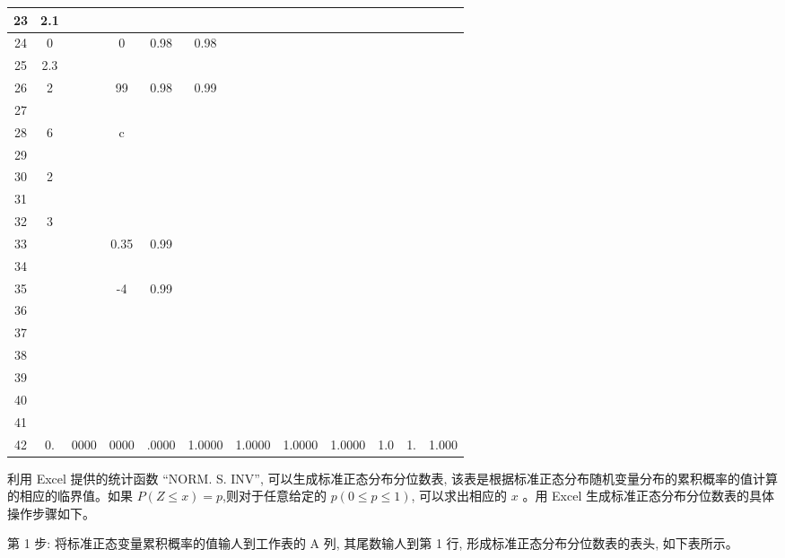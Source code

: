 \documentclass[10pt]{article}
\begin{document}
\begin{CJK*}{UTF8}{bsmi}
\begin{center}
\begin{tabular}{|c|c|c|c|c|c|c|c|c|c|c|c|}
\hline
23 & 2.1 &  &  &  &  &  &  &  &  &  &  \\
\hline
24 & 0 &  & 0 & 0.98 & 0.98 &  &  &  &  &  &  \\
\hline
25 & 2.3 &  &  &  &  &  &  &  &  &  &  \\
\hline
26 & 2 &  & 99 & 0.98 & 0.99 &  &  &  &  &  &  \\
\hline
27 &  &  &  &  &  &  &  &  &  &  &  \\
\hline
28 & 6 &  & c &  &  &  &  &  &  &  &  \\
\hline
29 &  &  &  &  &  &  &  &  &  &  &  \\
\hline
30 & 2 &  &  &  &  &  &  &  &  &  &  \\
\hline
31 &  &  &  &  &  &  &  &  &  &  &  \\
\hline
32 & 3 &  &  &  &  &  &  &  &  &  &  \\
\hline
33 &  &  & 0.35 & 0.99 &  &  &  &  &  &  &  \\
\hline
34 &  &  &  &  &  &  &  &  &  &  &  \\
\hline
35 &  &  & -4 & 0.99 &  &  &  &  &  &  &  \\
\hline
36 &  &  &  &  &  &  &  &  &  &  &  \\
\hline
37 &  &  &  &  &  &  &  &  &  &  &  \\
\hline
38 &  &  &  &  &  &  &  &  &  &  &  \\
\hline
39 &  &  &  &  &  &  &  &  &  &  &  \\
\hline
40 &  &  &  &  &  &  &  &  &  &  &  \\
\hline
41 &  &  &  &  &  &  &  &  &  &  &  \\
\hline
42 & 0. & 0000 & 0000 & .0000 & 1.0000 & 1.0000 & 1.0000 & 1.0000 & 1.0 & 1. & 1.000 \\
\hline
\end{tabular}
\end{center}

利用 Excel 提供的统计函数 “NORM. S. INV”, 可以生成标准正态分布分位数表, 该表是根据标准正态分布随机变量分布的累积概率的值计算的相应的临界值。如果 $P(Z \leqslant x)=p$,则对于任意给定的 $p(0 \leqslant p \leqslant 1)$, 可以求出相应的 $x$ 。用 Excel 生成标准正态分布分位数表的具体操作步骤如下。

第 1 步: 将标准正态变量累积概率的值输人到工作表的 A 列, 其尾数输人到第 1 行, 形成标准正态分布分位数表的表头, 如下表所示。


\end{CJK*}
\end{document}
